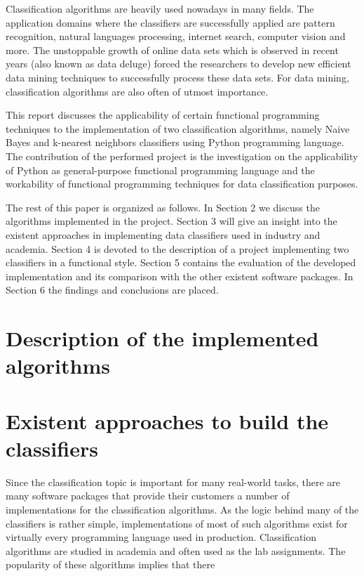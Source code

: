 \documentclass{llncs}
\begin{document}
Classification algorithms are heavily used nowadays in many fields. The application domains where the classifiers are successfully applied are pattern recognition, natural languages processing, internet search, computer vision and more. The unstoppable growth of online data sets which is observed in recent years (also known as data deluge) forced the researchers to develop new efficient data mining techniques to successfully process these data sets. For data mining, classification algorithms are also often of utmost importance.

This report discusses the applicability of certain functional programming techniques to the implementation of two classification algorithms, namely Naive Bayes and k-nearest neighbors classifiers using Python programming language. The contribution of the performed project is the investigation on the applicability of Python as general-purpose functional programming language and the workability of functional programming techniques for data classification purposes.

The rest of this paper is organized as follows. In Section 2 we discuss the algorithms implemented in the project. Section 3 will give an insight into the existent approaches in implementing data classifiers used in industry and academia. Section 4 is devoted to the description of a project implementing two classifiers in a functional style. Section 5 contains the evaluation of the developed implementation and its comparison with the other existent software packages. In Section 6 the findings and conclusions are placed.

\section{Description of the implemented algorithms}

\section{Existent approaches to build the classifiers}

Since the classification topic is important for many real-world tasks, there are many software packages that provide their customers a number of implementations for the classification algorithms. As the logic behind many of the classifiers is rather simple, implementations of most of such algorithms exist for virtually every programming language used in production. Classification algorithms are studied in academia and often used as the lab assignments. The popularity of these algorithms implies that there 
\end{document}
